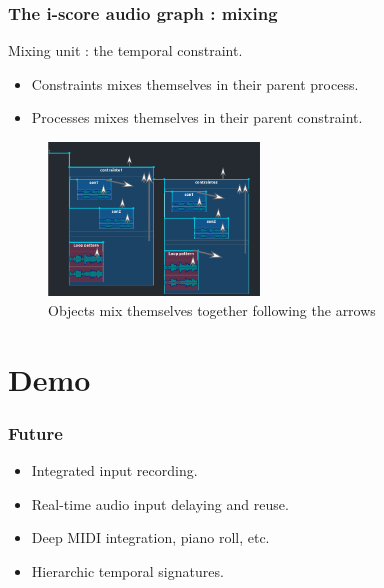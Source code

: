 \documentclass{beamer}
\begin{document}
\begin{frame}
    \frametitle{The i-score audio graph : mixing}    
	\Large
	
    Mixing unit : the temporal constraint.
    
    \begin{itemize}
        \item Constraints mixes themselves in their parent process.
        \item Processes mixes themselves in their parent constraint.
    \end{itemize}
    
	\begin{figure}
		\centering
		\includegraphics[width=0.5\textwidth]{images/mixage.png}
		\caption{Objects mix themselves together following the arrows}
	\end{figure}
\end{frame}


\section{Demo}
\begin{frame}
    \Huge
\end{frame}

\begin{frame}
	\frametitle{Future} 
	\Large
	\begin{itemize}
		\item<1> Integrated input recording.
		\item<2> Real-time audio input delaying and reuse.
		\item<3> Deep MIDI integration, piano roll, etc.
		\item<4> Hierarchic temporal signatures.
		
	\end{itemize}
\end{frame}    


\begin{frame}[allowframebreaks]%
    
    
    
    {\footnotesize
        \nocite{*}
        
        
    }
\end{frame}
\end{document}
